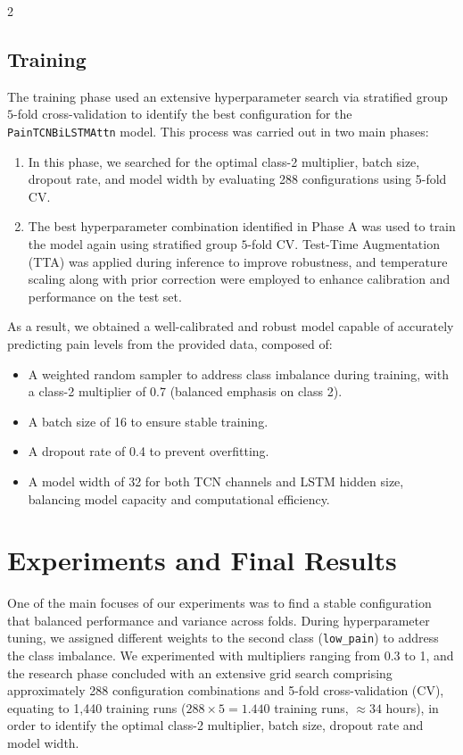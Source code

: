 \documentclass[11pt]{article}
\begin{document}
\begin{multicols}{2}
        \subsection*{Training}
        
        The training phase used an extensive hyperparameter search via stratified group $5$-fold cross-validation to identify the best configuration for the \texttt{PainTCNBiLSTMAttn} model. This process was carried out in two main phases:
        \begin{enumerate}[nosep,label=\textbf{\Alph*.}]
            \item In this phase, we searched for the optimal class-2 multiplier, batch size, dropout rate, and model width by evaluating 288 configurations using 5-fold CV.
            \item The best hyperparameter combination identified in Phase A was used to train the model again using stratified group $5$-fold CV. Test-Time Augmentation (TTA)\cite{wang2018automatic} was applied during inference to improve robustness, and temperature scaling along with prior correction were employed to enhance calibration and performance on the test set.
        \end{enumerate}
        As a result, we obtained a well-calibrated and robust model capable of accurately predicting pain levels from the provided data, composed of:
        \begin{itemize}
            \item A weighted random sampler to address class imbalance during training, with a class-2 multiplier of 0.7 (balanced emphasis on class 2).
            \item A batch size of 16 to ensure stable training.
            \item A dropout rate of 0.4 to prevent overfitting.
            \item A model width of 32 for both TCN channels and LSTM hidden size, balancing model capacity and computational efficiency.
        \end{itemize}

        \vspace{-1em}
        
        \section{Experiments and Final Results}

        One of the main focuses of our experiments was to find a stable configuration that balanced performance and variance across folds. During hyperparameter tuning, we assigned different weights to the second class (\texttt{low\_pain}) to address the class imbalance. We experimented with multipliers ranging from 0.3 to 1, and the research phase concluded with an extensive grid search comprising approximately 288 configuration combinations and 5-fold cross-validation (CV), equating to 1,440 training runs ($288 \times 5 = 1.440$ training runs, $\approx 34$ hours), in order to identify the optimal class-2 multiplier, batch size, dropout rate and model width.


\end{multicols}
\end{document}
